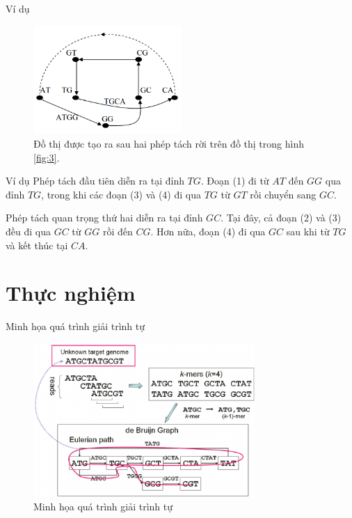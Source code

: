 \documentclass[10pt]{beamer}
\theoremstyle{remark}
\numberwithin{algocf}{section}
\numberwithin{equation}{section}
\numberwithin{dl}{section}
\numberwithin{figure}{section}
\begin{document}
\begin{frame}{Ví dụ}
    \begin{figure}[h!]
        \centering
        \includegraphics[width=0.5\textwidth]{8.png}
        \caption{Đồ thị được tạo ra sau hai phép tách rời trên đồ thị trong hình \ref{fig:3}.}
        \label{fig:8}
    \end{figure}

    
\end{frame}

\begin{frame}{Ví dụ}
    Phép tách đầu tiên diễn ra tại đỉnh $TG$. Đoạn (1) đi từ $AT$ đến $GG$ qua đỉnh $TG$, trong khi các đoạn (3) và (4) đi qua $TG$ từ $GT$ rồi chuyển sang $GC$.

    Phép tách quan trọng thứ hai diễn ra tại đỉnh $GC$. Tại đây, cả đoạn (2) và (3) đều đi qua $GC$ từ $GG$ rồi đến $CG$. 
    Hơn nữa, đoạn (4) đi qua $GC$ sau khi từ $TG$ và kết thúc tại $CA$.
\end{frame}

\section{Thực nghiệm}

\begin{frame}{Minh họa quá trình giải trình tự}
    \begin{figure}[h!]
        \centering
        \includegraphics[width=0.75\textwidth]{Illustration-of-de-Bruijn-graph-based-assembly.png}
        \caption{Minh họa quá trình giải trình tự}
    \end{figure}
\end{frame}
\end{document}
